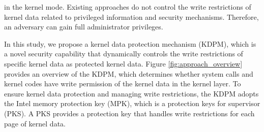 in the kernel mode. 
%
Existing approaches do not control the write restrictions of kernel data related to
privileged information and security mechanisms. Therefore, an adversary can 
gain full administrator privileges.
%


In this study, we propose a kernel data protection mechanism (KDPM), which is
a novel security capability that dynamically controls the write restrictions of
specific kernel data as protected kernel data. 
Figure \ref{fig:approach_overview} provides an overview of the KDPM,
%
which determines whether system calls and kernel codes have write permission of
the kernel data in the kernel layer.
%
To ensure kernel data protection and managing write restrictions, the KDPM
adopts the Intel memory protection key (MPK), which is a protection keys for
supervisor (PKS).
%
A PKS provides a protection key that handles write restrictions for each page of
kernel data.

